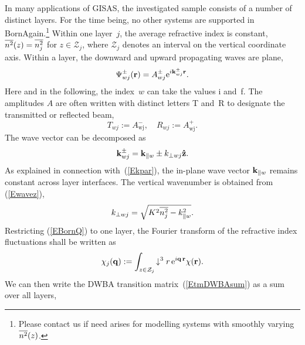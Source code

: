 In many applications of GISAS,
the investigated sample consists of a number of distinct layers.
For the time being,
no other systems are supported in BornAgain.\footnote
{Please contact us if need arises for modelling systems with
smoothly varying~$\overline{n^2}(z)$.
%
}
Within one layer~$j$, the average refractive index is constant,
$\overline{n^2}(z)=\overline{n_j^2}$ for $z\in\mathcal{Z}_j$, where
$\mathcal{Z}_j$ denotes an interval on the vertical coordinate axis.
Within a layer,
the downward and upward propagating waves are plane,
\begin{equation}
  \Psi^\pm_{wj}(\mathbf{r})=A^\pm_{wj}\text{e}^{i\mathbf{k}^\pm_{wj}\mathbf{r}}.
\end{equation}
%
%
%
%
%
Here and in the following,
the index~$w$ can take the values i and~f.
The amplitudes $A$ are often written with distinct letters
T and~R to designate the transmitted or reflected beam,
\begin{equation}
  T_{wj} := A^-_\text{wj},\quad
  R_{wj} := A^+_\text{wj}.
\end{equation}
The wave vector can be decomposed as
\begin{equation}
  \mathbf{k}^\pm_{wj}= \mathbf{k}_{\parallel w} \pm k_{\perp wj}\mathbf{\hat z}.
\end{equation}
%
%
As explained in connection with~(\ref{Ekpar}),
the in-plane wave vector $\mathbf{k}_{\parallel w}$ remains constant
across layer interfaces.
The vertical wavenumber is obtained from (\ref{Ewavez}),
\begin{equation}
  k_{\perp wj} = \sqrt{K^2 \overline{n_j^2} - k_{\parallel w}^2}.
\end{equation}
Restricting (\ref{EBornQ}) to one layer,
the Fourier transform of the refractive index fluctuations
shall be written as
\begin{equation}\label{Echij}
  \chi_j(\mathbf{q})
  := \int_{z\in\mathcal{Z}_j}\!\downarrow^3r\, \text{e}^{i\mathbf{q}\,\mathbf{r}}\chi(\mathbf{r}).
\end{equation}
%
We can then write the DWBA transition matrix~(\ref{EtmDWBAsum}) as
a sum over all layers,
%

